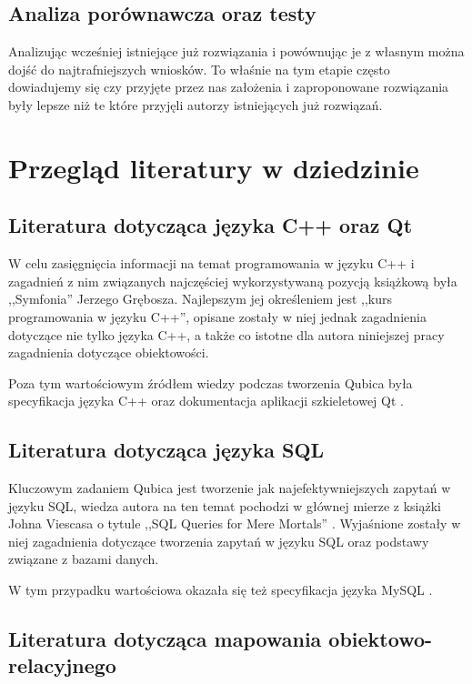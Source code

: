 \documentclass[12pt]{report}
\begin{document}
\subsection{Analiza porównawcza oraz testy}

Analizując wcześniej istniejące już rozwiązania i powównując je z własnym można dojść do najtrafniejszych wniosków. To właśnie na tym etapie często dowiadujemy się czy
przyjęte przez nas założenia i zaproponowane rozwiązania były lepsze niż te które przyjęli autorzy istniejących już rozwiązań. 

\section{Przegląd literatury w dziedzinie}

\subsection{Literatura dotycząca języka C++ oraz Qt}

W celu zasięgnięcia informacji na temat programowania w języku C++ i zagadnień z nim związanych najczęściej wykorzystywaną pozycją książkową była ,,Symfonia'' 
\cite{symfonia} Jerzego Grębosza. Najlepszym jej określeniem jest ,,kurs programowania w języku C++'', opisane zostały w niej jednak zagadnienia dotyczące nie tylko języka C++, a także co istotne dla autora niniejszej pracy zagadnienia dotyczące obiektowości.

Poza tym wartościowym źródłem wiedzy podczas tworzenia Qubica była specyfikacja języka C++ \cite{cpp} oraz dokumentacja aplikacji szkieletowej Qt \cite{qt}.

\subsection{Literatura dotycząca języka SQL}

Kluczowym zadaniem Qubica jest tworzenie jak najefektywniejszych zapytań w języku SQL, wiedza autora na ten temat pochodzi w głównej mierze z książki Johna Viescasa o
tytule ,,SQL Queries for Mere Mortals'' \cite{sql}. Wyjaśnione zostały w niej zagadnienia dotyczące tworzenia zapytań w języku SQL oraz podstawy związane z bazami danych.

W tym przypadku wartościowa okazała się też specyfikacja języka MySQL \cite{mysql}.

\subsection{Literatura dotycząca mapowania obiektowo-relacyjnego}
\end{document}
